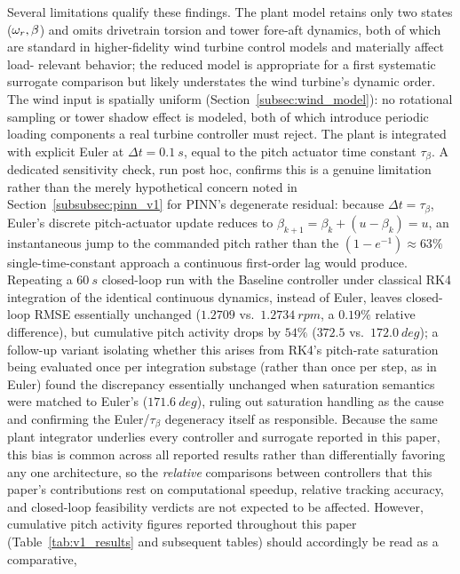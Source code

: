 Several limitations qualify these findings. The plant model retains only
two states ($\omega_r,\beta$) and omits drivetrain torsion and tower
fore-aft dynamics, both of which are standard in higher-fidelity wind
turbine control models \citep{schlipf2013} and materially affect load-
relevant behavior; the reduced model is appropriate for a first
systematic surrogate comparison but likely understates the wind
turbine's dynamic order.
The wind input is spatially uniform (Section~\ref{subsec:wind_model}):
no rotational sampling or tower shadow effect is modeled, both of which
introduce periodic loading components a real turbine controller must
reject. The plant is integrated with explicit Euler at
$\Delta t=\SI{0.1}{s}$, equal to the pitch actuator time constant
$\tau_\beta$. A dedicated sensitivity check, run post hoc, confirms
this is a genuine limitation rather than the merely hypothetical
concern noted in Section~\ref{subsubsec:pinn_v1} for PINN's
degenerate residual: because $\Delta t=\tau_\beta$, Euler's discrete
pitch-actuator update reduces to $\beta_{k+1}=\beta_k+(u-\beta_k)=u$,
an instantaneous jump to the commanded pitch rather than the
$(1-e^{-1})\approx63\%$ single-time-constant approach a continuous
first-order lag would produce. Repeating a $\SI{60}{s}$
closed-loop run with the Baseline controller under classical RK4
integration of the identical continuous dynamics, instead of Euler,
leaves closed-loop RMSE essentially unchanged ($1.2709$ vs.\
$\SI{1.2734}{rpm}$, a $0.19\%$ relative difference), but cumulative
pitch activity drops by $54\%$ ($372.5$ vs.\ $\SI{172.0}{deg}$); a
follow-up variant isolating whether this arises from RK4's pitch-rate
saturation being evaluated once per integration substage (rather than
once per step, as in Euler) found the discrepancy essentially
unchanged when saturation semantics were matched to Euler's
($\SI{171.6}{deg}$), ruling out saturation handling as the cause and
confirming the Euler/$\tau_\beta$ degeneracy itself as responsible.
Because the same plant integrator underlies every controller and
surrogate reported in this paper, this bias is common across all
reported results rather than differentially favoring any one
architecture, so the \emph{relative} comparisons between controllers
that this paper's contributions rest on  computational speedup,
relative tracking accuracy, and closed-loop feasibility verdicts 
are not expected to be affected. However, cumulative pitch activity
figures reported throughout this paper (Table~\ref{tab:v1_results} and
subsequent tables) should accordingly be read as a comparative,
